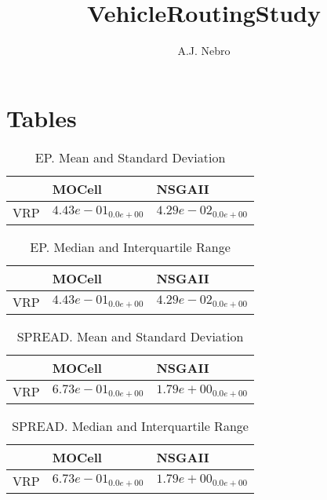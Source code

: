 \documentclass{article}
\title{VehicleRoutingStudy}
\author{A.J. Nebro}
\begin{document}
\maketitle
\section{Tables}

\begin{table}
\caption{EP. Mean and Standard Deviation}
\label{table: EP}
\centering
\begin{scriptsize}
\begin{tabular}{lll}
\hline & MOCell &  NSGAII\\
\hline 
VRP & \cellcolor{gray25}$  4.43e-01_{ 0.0e+00}$ & \cellcolor{gray95}$  4.29e-02_{ 0.0e+00}$ \\
\hline
\end{tabular}
\end{scriptsize}
\end{table}

\begin{table}
\caption{EP. Median and Interquartile Range}
\label{table: EP}
\centering
\begin{scriptsize}
\begin{tabular}{lll}
\hline & MOCell &  NSGAII\\
\hline 
VRP & \cellcolor{gray25}$  4.43e-01_{ 0.0e+00}$ & \cellcolor{gray95}$  4.29e-02_{ 0.0e+00}$ \\
\hline
\end{tabular}
\end{scriptsize}
\end{table}

\begin{table}
\caption{SPREAD. Mean and Standard Deviation}
\label{table: SPREAD}
\centering
\begin{scriptsize}
\begin{tabular}{lll}
\hline & MOCell &  NSGAII\\
\hline 
VRP & \cellcolor{gray95}$  6.73e-01_{ 0.0e+00}$ & \cellcolor{gray25}$  1.79e+00_{ 0.0e+00}$ \\
\hline
\end{tabular}
\end{scriptsize}
\end{table}

\begin{table}
\caption{SPREAD. Median and Interquartile Range}
\label{table: SPREAD}
\centering
\begin{scriptsize}
\begin{tabular}{lll}
\hline & MOCell &  NSGAII\\
\hline 
VRP & \cellcolor{gray95}$  6.73e-01_{ 0.0e+00}$ & \cellcolor{gray25}$  1.79e+00_{ 0.0e+00}$ \\
\hline
\end{tabular}
\end{scriptsize}
\end{table}
\end{document}
